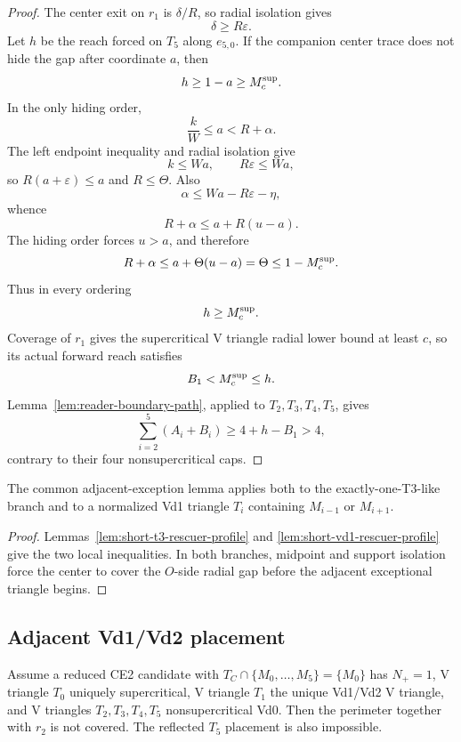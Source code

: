 \begin{proof}
The center exit on $r_1$ is $\delta/R$, so radial isolation gives
\[
 \delta\ge R\varepsilon.
\]
Let $h$ be the reach forced on $T_5$ along $e_{5,0}$.  If the companion center
trace does not hide the gap after coordinate $a$, then
\[
 h\ge1-a\ge M_c^{\rm sup}.
\]
In the only hiding order,
\[
 \frac{k}{W}\le a<R+\alpha.
\]
The left endpoint inequality and radial isolation give
\[
 k\le Wa,
 \qquad
 R\varepsilon\le Wa,
\]
so $R(a+\varepsilon)\le a$ and $R\le\Theta$.  Also
\[
 \alpha\le Wa-R\varepsilon-\eta,
\]
whence
\[
 R+\alpha\le a+R(u-a).
\]
The hiding order forces $u>a$, and therefore
\[
 R+\alpha\le a+\Theta(u-a)=\Theta\le 1-M_c^{\rm sup}.
\]
Thus in every ordering
\[
 h\ge M_c^{\rm sup}.
\]
Coverage of $r_1$ gives the supercritical V triangle radial lower bound at least $c$, so
its actual forward reach satisfies
\[
 B_1<M_c^{\rm sup}\le h.
\]
Lemma~\ref{lem:reader-boundary-path}, applied to $T_2,T_3,T_4,T_5$, gives
\[
 \sum_{i=2}^5(A_i+B_i)\ge4+h-B_1>4,
\]
contrary to their four nonsupercritical caps.
\end{proof}

\begin{corollary}
\label{cor:signed-adjacent-rescuers}
\label{thm:s2-geom-sc}
The common adjacent-exception lemma applies both to the exactly-one-T3-like
branch and to a normalized Vd1 triangle $T_i$ containing $M_{i-1}$ or
$M_{i+1}$.
\end{corollary}

\begin{proof}
Lemmas~\ref{lem:short-t3-rescuer-profile} and
\ref{lem:short-vd1-rescuer-profile} give the two local inequalities.  In both
branches, midpoint and support isolation force the center to cover the
$O$-side radial gap before the adjacent exceptional triangle begins.
\end{proof}

\subsection{Adjacent Vd1/Vd2 placement}

\begin{lemma}
\label{lem:signed-vd-adjacent-placement}
\label{thm:s2-geom-vd-adjacent}
Assume a reduced CE2 candidate with
$T_C\cap\{M_0,\ldots,M_5\}=\{M_0\}$ has $N_+=1$, V triangle $T_0$ uniquely
supercritical, V triangle $T_1$ the unique Vd1/Vd2 V triangle, and V triangles
$T_2,T_3,T_4,T_5$ nonsupercritical Vd0.  Then the perimeter together with
$r_2$ is not covered.  The reflected $T_5$ placement is also impossible.
\end{lemma}

